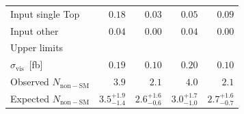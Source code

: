 \begin{table}[p]
\begin{center}
\begin{tabular}{lrrrr}
      Input single Top                & $0.18$                & $0.03$                & $0.05$                & $0.09$           \\[1ex]
      Input other                     & $0.04$                & $0.00$                & $0.04$                & $0.00$           \\
      \midrule
      Upper limits \\
      \midrule
      $\sigma_\mathrm{vis}$~[fb]      & $0.19$                & $0.10$                & $0.20$                & $0.10$                \\[1ex]
      Observed $N_\mathrm{non-SM}$    & $3.9$                 & $2.1$                 & $4.0$                 & $2.1$                 \\[1ex]
      Expected $N_\mathrm{non-SM}$    & ${3.5}^{+1.9}_{-1.4}$ & ${2.6}^{+1.6}_{-0.6}$ & ${3.0}^{+1.7}_{-1.0}$ & ${2.7}^{+1.6}_{-0.7}$ \\
      \bottomrule
    \end{tabular}
  \end{center}
\end{table}

